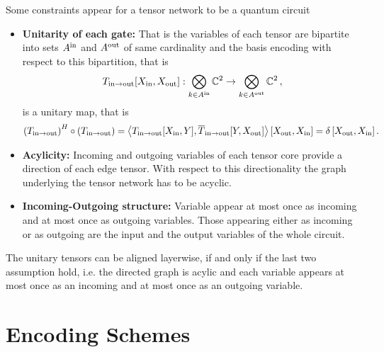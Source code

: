 \documentclass[aps,onecolumn,nofootinbib,pra]{article}
\begin{document}
    Some constraints appear for a tensor network to be a quantum circuit
    \begin{itemize}
        \item \textbf{Unitarity of each gate:} That is the variables of each tensor are bipartite into sets $A^{\mathrm{in}}$ and $A^{\mathrm{out}}$ of same cardinality and the basis encoding with respect to this bipartition, that is
        \begin{align*}
            T_{\mathrm{in} \rightarrow \mathrm{out}}[X_{\mathrm{in}},X_{\mathrm{out}}] : \bigotimes_{k\in A^{\mathrm{in}}} \mathbb{C}^2 \rightarrow \bigotimes_{k\in A^{\mathrm{out}}} \mathbb{C}^2  \, ,
        \end{align*}
        is a unitary map, that is
        \begin{align*}
            \left(T_{\mathrm{in} \rightarrow \mathrm{out}}\right)^H \circ \left(T_{\mathrm{in} \rightarrow \mathrm{out}}\right)
            = \left\langle 
                T_{\mathrm{in} \rightarrow \mathrm{out}}[X_{\mathrm{in}},Y],
                \overline{T}_{\mathrm{in} \rightarrow \mathrm{out}}[Y,X_{\mathrm{out}}]
            \right\rangle \left[ X_{\mathrm{out}},X_{\mathrm{in}} \right]
            = \delta\left[X_{\mathrm{out}},X_{\mathrm{in}}\right].
        \end{align*}
        \item \textbf{Acylicity:} Incoming and outgoing variables of each tensor core provide a direction of each edge tensor. With respect to this directionality the graph underlying the tensor network has to be acyclic.
        \item \textbf{Incoming-Outgoing structure:} Variable appear at most once as incoming and at most once as outgoing variables.
        Those appearing either as incoming or as outgoing are the input and the output variables of the whole circuit.
    \end{itemize}

    The unitary tensors can be aligned layerwise, if and only if the last two assumption hold, i.e. the directed graph is acylic and each variable appears at most once as an incoming and at most once as an outgoing variable.
    
    \section{Encoding Schemes}
\end{document}
